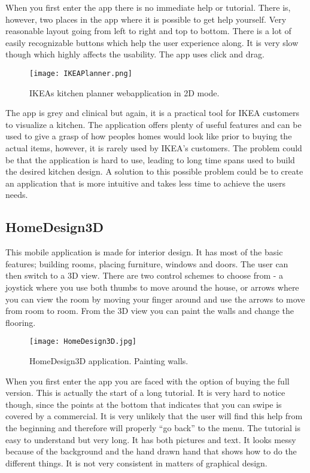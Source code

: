 When you first enter the app there is no immediate help or tutorial. There is, however, two places in the app where it is possible to get help yourself. Very reasonable layout going from left to right and top to bottom. There is a lot of easily recognizable buttons which help the user experience along. 
It is very slow though which highly affects the usability. The app uses click and drag.

\begin{figure}[H]
\centering
\texttt{[image: IKEAPlanner.png]}
\caption{IKEAs kitchen planner webapplication in 2D mode.}
\end{figure}

The app is grey and clinical but again, it is a practical tool for IKEA customers to visualize a kitchen. 
The application offers plenty of useful features and can be used to give a grasp of how peoples homes would look like prior to buying the actual items, however, it is rarely used by IKEA's customers. The problem could be that the application is hard to use, leading to long time spans used to build the desired kitchen design. A solution to this possible problem could be to create an application that is more intuitive and takes less time to achieve the users needs.

\subsection{HomeDesign3D}
This mobile application is made for interior design. It has most of the basic features; building rooms, placing furniture, windows and doors. The user can then switch to a 3D view. There are two control schemes to choose from - a joystick where you use both thumbs to move around the house, or arrows where you can view the room by moving your finger around and use the arrows to move from room to room. From the 3D view you can paint the walls and change the flooring.

\begin{figure}[H]
\centering
\texttt{[image: HomeDesign3D.jpg]}
\caption{HomeDesign3D application. Painting walls.}
\end{figure}

When you first enter the app you are faced with the option of buying the full version. This is actually the start of a long tutorial. It is very hard to notice though, since the points at the bottom that indicates that you can swipe is covered by a commercial. It is very unlikely that the user will find this help from the beginning and therefore will properly “go back” to the menu. The tutorial is easy to understand but very long. It has both pictures and text. It looks messy because of the background and the hand drawn hand that shows how to do the different things. It is not very consistent in matters of graphical design. 

